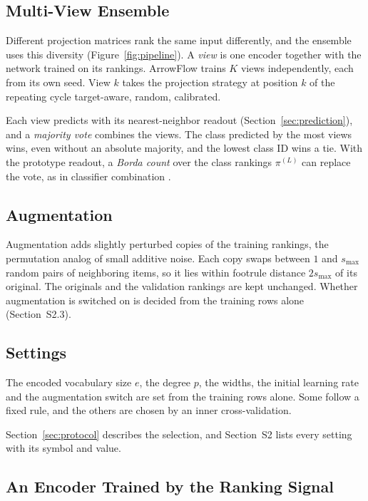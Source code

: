 \subsection{Multi-View Ensemble}\label{sec:ensemble}

Different projection matrices rank the same input differently, and the ensemble uses this diversity (Figure~\ref{fig:pipeline}). A \emph{view} is one encoder together with the network trained on its rankings. ArrowFlow trains $K$ views independently, each from its own seed. View $k$ takes the projection strategy at position $k$ of the repeating cycle target-aware, random, calibrated.

Each view predicts with its nearest-neighbor readout (Section~\ref{sec:prediction}), and a \emph{majority vote} combines the views. The class predicted by the most views wins, even without an absolute majority, and the lowest class ID wins a tie. With the prototype readout, a \emph{Borda count} over the class rankings $\pi^{(L)}$ can replace the vote, as in classifier combination \citep{ho1994decision,vanerp2000variants}.

\subsection{Augmentation}\label{sec:augmentation}

Augmentation adds slightly perturbed copies of the training rankings, the permutation analog of small additive noise. Each copy swaps between $1$ and $s_{\max}$ random pairs of neighboring items, so it lies within footrule distance $2s_{\max}$ of its original. The originals and the validation rankings are kept unchanged. Whether augmentation is switched on is decided from the training rows alone (Section~S2.3).

\subsection{Settings}\label{sec:settings}

The encoded vocabulary size $e$, the degree $p$, the widths, the initial learning rate and the augmentation switch are set from the training rows alone. Some follow a fixed rule, and the others are chosen by an inner cross-validation.

Section~\ref{sec:protocol} describes the selection, and Section~S2 lists every setting with its symbol and value.

\subsection{An Encoder Trained by the Ranking Signal}\label{sec:learned-encoder}

